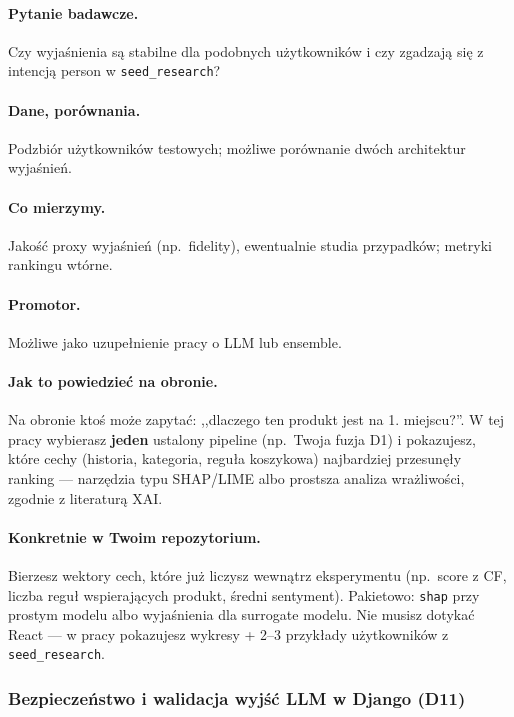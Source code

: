 \documentclass[a4paper,11pt]{article}
\newcommand{\code}[1]{\texttt{\small #1}}
\begin{document}
\paragraph{Pytanie badawcze.}
Czy wyjaśnienia są stabilne dla podobnych użytkowników i czy zgadzają się z intencją person w \texttt{seed\_research}?

\paragraph{Dane, porównania.}
Podzbiór użytkowników testowych; możliwe porównanie dwóch architektur wyjaśnień.

\paragraph{Co mierzymy.}
Jakość proxy wyjaśnień (np.\ fidelity), ewentualnie studia przypadków; metryki rankingu wtórne.

\paragraph{Promotor.}
Możliwe jako uzupełnienie pracy o LLM lub ensemble.

\paragraph{Jak to powiedzieć na obronie.}
Na obronie ktoś może zapytać: ,,dlaczego ten produkt jest na 1. miejscu?''. W tej pracy wybierasz \textbf{jeden} ustalony pipeline (np.\ Twoja fuzja D1) i pokazujesz, które cechy (historia, kategoria, reguła koszykowa) najbardziej przesunęły ranking --- narzędzia typu SHAP/LIME albo prostsza analiza wrażliwości, zgodnie z literaturą XAI.

\paragraph{Konkretnie w Twoim repozytorium.}
Bierzesz wektory cech, które już liczysz wewnątrz eksperymentu (np.\ score z CF, liczba reguł wspierających produkt, średni sentyment). Pakietowo: \code{shap} przy prostym modelu albo wyjaśnienia dla surrogate modelu. Nie musisz dotykać React --- w pracy pokazujesz wykresy + 2--3 przykłady użytkowników z \texttt{seed\_research}.

\subsubsection{Bezpieczeństwo i walidacja wyjść LLM w Django (\textbf{D11})}
\end{document}
